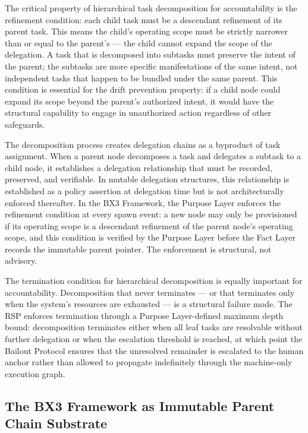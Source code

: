 The critical property of hierarchical task decomposition for accountability is the refinement condition: each child task must be a descendant refinement of its parent task. This means the child's operating scope must be strictly narrower than or equal to the parent's — the child cannot expand the scope of the delegation. A task that is decomposed into subtasks must preserve the intent of the parent; the subtasks are more specific manifestations of the same intent, not independent tasks that happen to be bundled under the same parent. This condition is essential for the drift prevention property: if a child node could expand its scope beyond the parent's authorized intent, it would have the structural capability to engage in unauthorized action regardless of other safeguards.\cite{arxiv2602.11865}

The decomposition process creates delegation chains as a byproduct of task assignment. When a parent node decomposes a task and delegates a subtask to a child node, it establishes a delegation relationship that must be recorded, preserved, and verifiable. In mutable delegation structures, this relationship is established as a policy assertion at delegation time but is not architecturally enforced thereafter. In the BX3 Framework, the Purpose Layer enforces the refinement condition at every spawn event: a new node may only be provisioned if its operating scope is a descendant refinement of the parent node's operating scope, and this condition is verified by the Purpose Layer before the Fact Layer records the immutable parent pointer. The enforcement is structural, not advisory.\cite{bx3_framework_scope}

The termination condition for hierarchical decomposition is equally important for accountability. Decomposition that never terminates — or that terminates only when the system's resources are exhausted — is a structural failure mode. The RSP enforces termination through a Purpose Layer-defined maximum depth bound: decomposition terminates either when all leaf tasks are resolvable without further delegation or when the escalation threshold is reached, at which point the Bailout Protocol ensures that the unresolved remainder is escalated to the human anchor rather than allowed to propagate indefinitely through the machine-only execution graph.\cite{bx3_recursive_spawning_integration}

\subsection{The BX3 Framework as Immutable Parent Chain Substrate}
\label{sec:rs-bx3-substrate}

